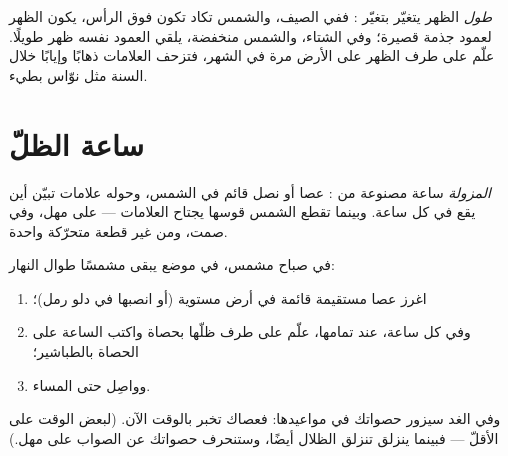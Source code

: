 \begin{example}\label{ex:g3:sun-days-seasons:shadowlength}
\emph{طول}  الظهر يتغيّر بتغيّر : ففي الصيف، والشمس
تكاد تكون فوق الرأس، يكون  الظهر لعمود جذمة قصيرة؛ وفي الشتاء،
والشمس منخفضة، يلقي العمود نفسه  ظهر طويلًا. علّم على طرف 
الظهر على الأرض مرة في الشهر، فتزحف العلامات ذهابًا وإيابًا خلال
السنة مثل نوّاس بطيء.
\end{example}

\section{ساعة الظلّ}

\begin{definition}[المزولة]\label{def:g3:sun-days-seasons:sundial}
\emph{المزولة} ساعة مصنوعة من : عصا أو نصل قائم
في الشمس، وحوله علامات تبيّن أين يقع  في كل ساعة. وبينما
تقطع الشمس قوسها يجتاح  العلامات --- على مهل، وفي صمت، ومن
غير قطعة متحرّكة واحدة.
\end{definition}

\begin{method}\label{met:g3:sun-days-seasons:build}
في صباح مشمس، في موضع يبقى مشمسًا طوال النهار:
\begin{enumerate}
  \item اغرز عصا مستقيمة قائمة في أرض مستوية (أو انصبها في دلو
        رمل)؛
  \item وفي كل ساعة، عند تمامها، علّم على طرف ظلّها بحصاة واكتب
        الساعة على الحصاة بالطباشير؛
  \item وواصِل حتى المساء.
\end{enumerate}
وفي الغد سيزور  حصواتك في مواعيدها: فعصاك تخبر بالوقت الآن.
(لبعض الوقت على الأقلّ --- فبينما ينزلق  تنزلق الظلال
أيضًا، وستنحرف حصواتك عن الصواب على مهل.)
\end{method}

